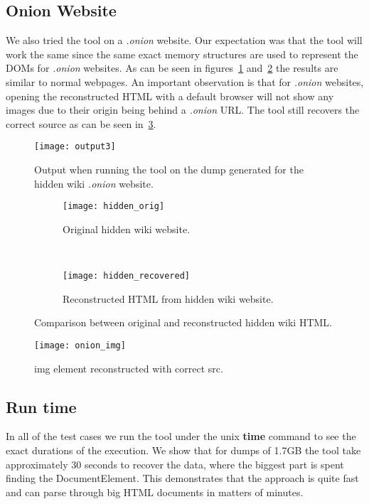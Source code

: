 \subsection{Onion Website}
We also tried the tool on a \textit{.onion} website. Our expectation
was that the tool will work the same since the same exact memory
structures are used to represent the DOMs for \textit{.onion}
websites. As can be seen in figures~\ref{img:output3}
and~\ref{fig:hidden_compare} the results are similar to normal
webpages. An important observation is that for \textit{.onion}
websites, opening the reconstructed HTML with a default browser will
not show any images due to their origin being behind a \textit{.onion}
URL. The tool still recovers the correct source as can be seen
in~\ref{img:onion_img}.

\begin{figure}[h]
  \centering \texttt{[image: output3]}
  \caption{Output when running the tool on the dump generated for the
    hidden wiki \textit{.onion} website.}
  \label{img:output3}
\end{figure}

\begin{figure}[H]
  \begin{subfigure}{\linewidth}
    \centering \texttt{[image: hidden\_orig]}
    \caption{Original hidden wiki website.}
  \end{subfigure}\\[1ex]

  \begin{subfigure}{\linewidth}
    \centering \texttt{[image: hidden\_recovered]}
    \caption{Reconstructed HTML from hidden wiki website.}
  \end{subfigure}
  \caption{Comparison between original and reconstructed hidden wiki
    HTML.}
  \label{fig:hidden_compare}
\end{figure}

\begin{figure}[H]
  \centering \texttt{[image: onion\_img]}
  \caption{img element reconstructed with correct src.}
  \label{img:onion_img}
\end{figure}

\subsection{Run time}
In all of the test cases we run the tool under the unix \textbf{time}
command to see the exact durations of the execution. We show that for
dumps of 1.7GB the tool take approximately 30 seconds to recover the
data, where the biggest part is spent finding the
DocumentElement. This demonstrates that the approach is quite fast and
can parse through big HTML documents in matters of minutes.
